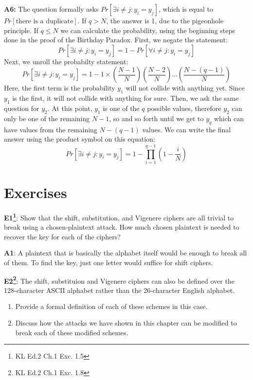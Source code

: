 \documentclass[12pt,reqno]{amsart}
\begin{document}
\textbf{A6:} The question formally asks $Pr[\exists i\ne j : y_i = y_j]$, which is equal to $Pr[\text{there is a duplicate}]$. If $q > N$, the answer is 1, due to the pigeonhole principle. If $q \leq N$ we can calculate the probability, using the beginning steps done in the proof of the Birthday Paradox. First, we negate the statement:
$$
Pr[\exists i \ne j : y_i = y_j] = 1 - Pr[\forall i\ne j : y_i = y_j]
$$
Next, we unroll the probabilty statement:
$$
Pr[\exists i \ne j : y_i = y_j] = 1- 1\times\left(\frac{N-1}{N}\right)\left(\frac{N-2}{N}\right)\ldots\left(\frac{N-(q-1)}{N}\right)
$$
Here, the first term is the probability $y_1$ will not collide with anything yet. Since $y_1$ is the first, it will not collide with anything for sure.
Then, we ask the same question for $y_2$. At this point, $y_1$ is one of the $q$ possible values, therefore $y_2$ can only be one of the remaining $N-1$, so and so forth until we get to $y_q$ which can have values from the remaining $N-(q-1)$ values. We can write the final answer using the product symbol on this equation:
$$
Pr[\exists i \ne j : y_i = y_j]= 1- \prod_{i=1}^{q-1}\left(1-\frac{i}{N}\right)
$$
 
\section{Exercises}

\textbf{E1\footnote{KL Ed.2 Ch.1 Exc. 1.5}}: Show that the shift, substitution, and Vigenere ciphers are all trivial to break using a chosen-plaintext attack. How much chosen plaintext is needed to recover the key for each of the ciphers?

\textbf{A1}: A plaintext that is basically the alphabet itself would be enough to break all of them. To find the key, just one letter would suffice for shift ciphers.

\vspace{20px}
\textbf{E2\footnote{KL Ed.2 Ch.1 Exc. 1.8}}: The shift, substituion and Vigenere ciphers can also be defined over the 128-character ASCII alphabet rather than the 26-character English alphabet. 
\begin{enumerate}[label=\alph*]
\item Provide a formal definition of each of these schemes in this case.
\item Discuss how the attacks we have shown in this chapter can be modified to break each of these modified schemes.
\end{enumerate}
\end{document}
